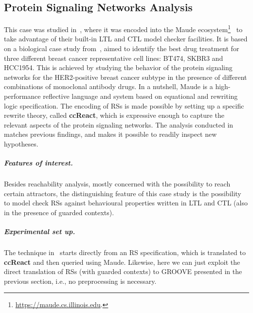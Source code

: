 
\subsection{Protein Signaling Networks Analysis}

This case was studied in~\cite{DBLP:conf/cmsb/BallisBFO24}, where it was encoded into the Maude ecosystem\footnote{\url{https://maude.cs.illinois.edu}.}~\cite{DBLP:conf/maude/2007} to take advantage of their built-in LTL and CTL model checker facilities. It is based on a biological case study from~\cite{derHeyde2014}, aimed to identify the best drug treatment for three different breast cancer representative cell lines: BT474, SKBR3 and HCC1954. This is achieved by studying the behavior of the protein signaling networks for the HER2-positive breast cancer subtype in the presence of different combinations of monoclonal antibody drugs.
In a nutshell, Maude is a high-performance reflective language and system based on equational and rewriting logic specification. 
The encoding of RSs is made possible by setting up a specific rewrite theory, called \textbf{ccReact}, which is expressive enough to capture the relevant aspects of the protein signaling networks.
The analysis conducted in~\cite{DBLP:conf/cmsb/BallisBFO24} matches previous findings, and makes it possible to readily inspect new hypotheses.

\subparagraph*{Features of interest.}
Besides reachability analysis, mostly concerned with the possibility to reach certain attractors, the distinguishing feature of this case study is the possibility to model check RSs against behavioural properties written in LTL and CTL (also in the presence of guarded contexts).

\subparagraph*{Experimental set up.}
The technique in~\cite{DBLP:conf/cmsb/BallisBFO24} starts directly from an RS specification, which is translated to \textbf{ccReact} and then queried using Maude. Likewise, here we can just exploit the direct translation of RSs (with guarded contexts) to GROOVE presented in the previous section, i.e., no preprocessing is necessary.

